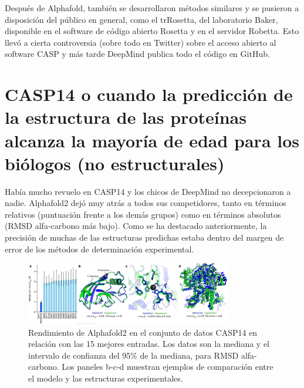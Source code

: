Después de Alphafold, también se desarrollaron métodos similares y se pusieron a disposición del público en general, como el trRosetta, del laboratorio Baker, disponible en el software de código abierto Rosetta y en el servidor Robetta. Esto llevó a cierta controversia (sobre todo en Twitter) sobre el acceso abierto al software CASP y más tarde DeepMind publica todo el código en GitHub.

\section{CASP14 o cuando la predicción de la estructura de las proteínas alcanza la mayoría de edad para los biólogos (no estructurales)}
Había mucho revuelo en CASP14 y los chicos de DeepMind no decepcionaron a nadie. Alphafold2 dejó muy atrás a todos sus competidores, tanto en términos relativos (puntuación frente a los demás grupos) como en términos absolutos (RMSD alfa-carbono más bajo). Como se ha destacado anteriormente, la precisión de muchas de las estructuras predichas estaba dentro del margen de error de los métodos de determinación experimental.

\begin{figure}[h]
\centering
\includegraphics[width = 0.8\textwidth]{figs/jumper2021.png}
\caption{Rendimiento de Alphafold2 en el conjunto de datos CASP14 en relación con las 15 mejores entradas. Los datos son la mediana y el intervalo de confianza del 95\% de la mediana, para RMSD alfa-carbono. Los paneles b-c-d muestran ejemplos de comparación entre el modelo y las estructuras experimentales.}
\end{figure}

